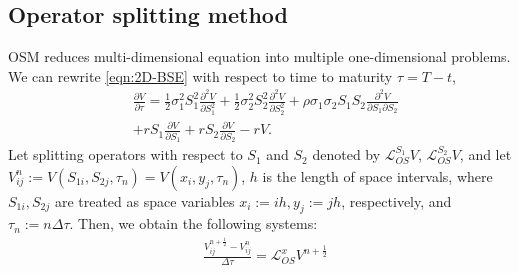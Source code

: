 \documentclass[11pt,reqno]{article}
\numberwithin{equation}{section}
\begin{document}
{\subsection{Operator splitting method}
OSM reduces multi-dimensional equation into multiple one-dimensional problems.
 We can rewrite \eqref{eqn:2D-BSE} with respect to time to maturity $\tau = T - t$,
\begin{equation}\label{eqn:2D-BSE_tau}
\begin{aligned}
    &\frac{\partial V}{\partial \tau} 
    = \frac{1}{2} \sigma_1^2 S_1^2 \frac{\partial^2 V}{\partial S_1^2}
    + \frac{1}{2} \sigma_2^2 S_2^2 \frac{\partial^2 V}{\partial S_2^2}
    + \rho \sigma_1 \sigma_2 S_1 S_2 \frac{\partial^2 V}{\partial S_1 \partial S_2} \\
    &+ r S_1 \frac{\partial V}{\partial S_1}
    + r S_2 \frac{\partial V}{\partial S_2}  - rV.
\end{aligned}
\end{equation} 
Let splitting operators with respect to $S_1$ and
 $S_2$ denoted by $\mathcal{L}_{OS}^{S_1}V$, $\mathcal{L}_{OS}^{S_2}V$, and
let $V_{ij}^n := V(S_{1i}, S_{2j}, \tau_n) = V(x_i, y_j, \tau_n)$, $h$ is the length of space intervals,
 where $S_{1i}, S_{2j}$ are treated as space variables $x_i := ih, y_j := jh$, respectively,
  and $\tau_n := n \Delta \tau$. 
 Then, we obtain the following systems:
\begin{equation}\label{eqn:L_OS_S1}
\begin{aligned}
    &\frac{V_{ij}^{n + \frac{1}{2}} - V_{ij}^{n}}{\Delta \tau}
    = \mathcal{L}_{OS}^{x}V^{n + \frac{1}{2}} \\ 

\end{aligned}
\end{equation}}
\end{document}
